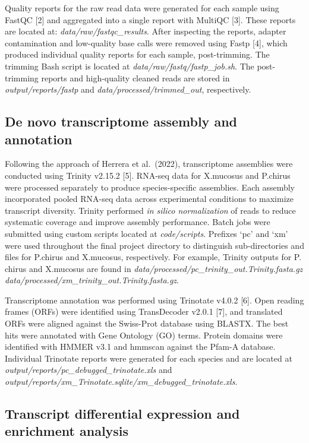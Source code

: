 \documentclass[12pt,]{article}
\begin{document}
Quality reports for the raw read data were generated for each sample
using FastQC {[}2{]} and aggregated into a single report with MultiQC
{[}3{]}. These reports are located at: \emph{data/raw/fastqc\_results}.
After inspecting the reports, adapter contamination and low-quality base
calls were removed using Fastp {[}4{]}, which produced individual
quality reports for each sample, post-trimming. The trimming Bash script
is located at \emph{data/raw/fastq/fastp\_job.sh}. The post-trimming
reports and high-quality cleaned reads are stored in
\emph{output/reports/fastp} and \emph{data/processed/trimmed\_out},
respectively.

\subsection{De novo transcriptome assembly and
annotation}\label{de-novo-transcriptome-assembly-and-annotation}

Following the approach of Herrera et al.~(2022), transcriptome
assemblies were conducted using Trinity v2.15.2 {[}5{]}. RNA-seq data
for X.mucosus and P.chirus were processed separately to produce
species-specific assemblies. Each assembly incorporated pooled RNA-seq
data across experimental conditions to maximize transcript diversity.
Trinity performed \emph{in silico normalization} of reads to reduce
systematic coverage and improve assembly performance. Batch jobs were
submitted using custom scripts located at \emph{code/scripts}. Prefixes
`pc' and `xm' were used throughout the final project directory to
distinguish sub-directories and files for P.chirus and X.mucosus,
respectively. For example, Trinity outputs for P. chirus and X.mucosus
are found in \emph{data/processed/pc\_trinity\_out.Trinity.fasta.gz}
\emph{data/processed/xm\_trinity\_out.Trinity.fasta.gz}.

Transcriptome annotation was performed using Trinotate v4.0.2 {[}6{]}.
Open reading frames (ORFs) were identified using TransDecoder v2.0.1
{[}7{]}, and translated ORFs were aligned against the Swiss-Prot
database using BLASTX. The best hits were annotated with Gene Ontology
(GO) terms. Protein domains were identified with HMMER v3.1 and hmmscan
against the Pfam-A database. Individual Trinotate reports were generated
for each species and are located at
\emph{output/reports/pc\_debugged\_trinotate.xls} and
\emph{output/reports/xm\_Trinotate.sqlite/xm\_debugged\_trinotate.xls}.

\subsection{Transcript differential expression and enrichment
analysis}\label{transcript-differential-expression-and-enrichment-analysis}
\end{document}
